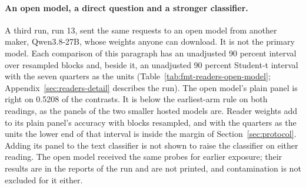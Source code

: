 \paragraph{An open model, a direct question and a stronger classifier.} A third run, run 13, sent the same requests to an open model from another maker, Qwen3.8-27B, whose weights anyone can download. It is not the primary model. Each comparison of this paragraph has an unadjusted 90 percent interval over resampled blocks and, beside it, an unadjusted 90 percent Student-t interval with the seven quarters as the units (Table~\ref{tab:fmt-readers-open-model}; Appendix~\ref{sec:readers-detail} describes the run). The open model's plain panel is right on 0.5208 of the contrasts. It is below the earliest-arm rule on both readings, as the panels of the two smaller hosted models are. Reader weights add to its plain panel's accuracy with blocks resampled, and with the quarters as the units the lower end of that interval is inside the margin of Section~\ref{sec:protocol}. Adding its panel to the text classifier is not shown to raise the classifier on either reading. The open model received the same probes for earlier exposure; their results are in the reports of the run and are not printed, and contamination is not excluded for it either.

